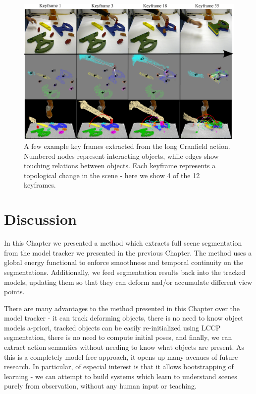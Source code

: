 \begin{figure}[ht!]
  \centering
  \includegraphics[width=\linewidth]{figures/IROS2013/SECKF.pdf}
  \caption[Cranfield Key Frames]{A few example key frames extracted from the long Cranfield action. Numbered nodes represent interacting objects, while edges show touching relations between objects. Each keyframe represents a topological change in the scene - here we show 4 of the 12 keyframes.}
  \label{fig:SECGraphs}
\end{figure}

\section{Discussion}
In this Chapter we presented a method which extracts full scene segmentation from the model tracker we presented in the previous Chapter. The method uses a global energy functional to enforce smoothness and temporal continuity on the segmentations. Additionally, we feed segmentation results back into the tracked models, updating them so that they can deform and/or accumulate different view points. 

There are many advantages to the method presented in this Chapter over the model tracker - it can track deforming objects, there is no need to know object models a-priori, tracked objects can be easily re-initialized using LCCP segmentation, there is no need to compute initial poses, and finally, we can extract action semantics without needing to know what objects are present. As this is a completely model free approach, it opens up many avenues of future research. In particular, of especial interest is that it allows bootstrapping of learning - we can attempt to build systems which learn to understand scenes purely from observation, without any human input or teaching.